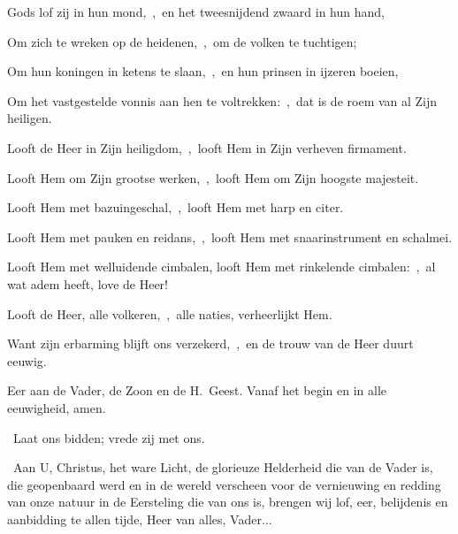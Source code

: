 \documentclass[12pt,twoside,a5paper]{article}
\begin{document}
\begin{halfparskip}
  Gods lof zij in hun mond,~\sep\ en het tweesnijdend zwaard in hun hand,

  Om zich te wreken op de heidenen,~\sep\ om de volken te tuchtigen;

  Om hun koningen in ketens te slaan,~\sep\ en hun prinsen in ijzeren boeien,

  Om het vastgestelde vonnis aan hen te voltrekken:~\sep\ dat is de roem van al Zijn heiligen.

   Looft de Heer in Zijn heiligdom,~\sep\ looft Hem in Zijn verheven firmament.

  Looft Hem om Zijn grootse werken,~\sep\ looft Hem om Zijn hoogste majesteit.

  Looft Hem met bazuingeschal,~\sep\ looft Hem met harp en citer.

  Looft Hem met pauken en reidans,~\sep\ looft Hem met snaarinstrument en schalmei.

  Looft Hem met welluidende cimbalen, looft Hem met rinkelende cimbalen:~\sep\ al wat adem heeft, love de Heer!

   Looft de Heer, alle volkeren,~\sep\ alle naties, verheerlijkt Hem.

  Want zijn erbarming blijft ons verzekerd,~\sep\ en de trouw van de Heer duurt eeuwig.

  Eer aan de Vader, de Zoon en de H.~Geest. Vanaf het begin en in alle eeuwigheid, amen.

\end{halfparskip}

\begin{halfparskip}
  \dd~Laat ons bidden; vrede zij met ons.

  \cc~Aan U, Christus, het ware Licht, de glorieuze Helderheid die van de Vader is, die geopenbaard werd en in de wereld verscheen voor de vernieuwing en redding van onze natuur in de Eersteling die van ons is, brengen wij lof, eer, belijdenis en aanbidding te allen tijde, Heer van alles, Vader...
\end{halfparskip}



 
\end{document}

